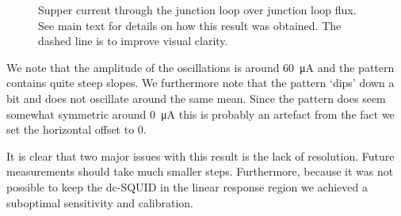 \begin{figure}[ht!]
	\centering
	
	\caption{Supper current through the junction loop over junction loop flux. See main text for details on how this result was obtained. The dashed line is to improve visual clarity.}
	\label{fig:CP2.6B_super_current_over_loop_flux}
\end{figure}

We note that the amplitude of the oscillations is around \qty{60}{\micro\ampere} and the pattern contains quite steep slopes. We furthermore note that the pattern `dips' down a bit and does not oscillate around the same mean. Since the pattern does seem somewhat symmetric around \qty{0}{\micro\ampere} this is probably an artefact from the fact we set the horizontal offset to 0.

It is clear that two major issues with this result is the lack of resolution. Future measurements should take much smaller steps. Furthermore, because it was not possible to keep the dc-SQUID in the linear response region we achieved a suboptimal sensitivity and calibration.